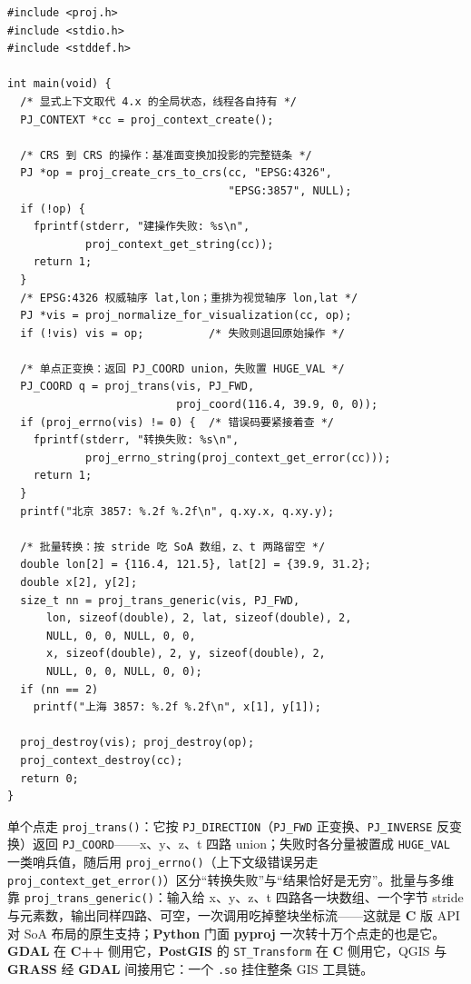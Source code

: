 \documentclass[12pt,a4paper,fontset=fandol]{ctexbook}
\newcommand{\Fn}[1]{\texttt{#1()}}
\newcommand{\Tp}[1]{\texttt{#1}}
\newcommand{\Lib}[1]{\textbf{#1}}
\newcommand{\Lang}[1]{\textsf{\bfseries #1}}
\newcommand{\CL}{\Lang{C}}
\newcommand{\CPP}{\Lang{C++}}
\newcommand{\PY}{\Lang{Python}}
\begin{document}
\begin{lstlisting}[style=cstyle,caption={\Lib{PROJ}：上下文创建、轴序归一化与转换错误处理},label={lst:ch08-proj}]
#include <proj.h>
#include <stdio.h>
#include <stddef.h>

int main(void) {
  /* 显式上下文取代 4.x 的全局状态，线程各自持有 */
  PJ_CONTEXT *cc = proj_context_create();

  /* CRS 到 CRS 的操作：基准面变换加投影的完整链条 */
  PJ *op = proj_create_crs_to_crs(cc, "EPSG:4326",
                                  "EPSG:3857", NULL);
  if (!op) {
    fprintf(stderr, "建操作失败: %s\n",
            proj_context_get_string(cc));
    return 1;
  }
  /* EPSG:4326 权威轴序 lat,lon；重排为视觉轴序 lon,lat */
  PJ *vis = proj_normalize_for_visualization(cc, op);
  if (!vis) vis = op;          /* 失败则退回原始操作 */

  /* 单点正变换：返回 PJ_COORD union，失败置 HUGE_VAL */
  PJ_COORD q = proj_trans(vis, PJ_FWD,
                          proj_coord(116.4, 39.9, 0, 0));
  if (proj_errno(vis) != 0) {  /* 错误码要紧接着查 */
    fprintf(stderr, "转换失败: %s\n",
            proj_errno_string(proj_context_get_error(cc)));
    return 1;
  }
  printf("北京 3857: %.2f %.2f\n", q.xy.x, q.xy.y);

  /* 批量转换：按 stride 吃 SoA 数组，z、t 两路留空 */
  double lon[2] = {116.4, 121.5}, lat[2] = {39.9, 31.2};
  double x[2], y[2];
  size_t nn = proj_trans_generic(vis, PJ_FWD,
      lon, sizeof(double), 2, lat, sizeof(double), 2,
      NULL, 0, 0, NULL, 0, 0,
      x, sizeof(double), 2, y, sizeof(double), 2,
      NULL, 0, 0, NULL, 0, 0);
  if (nn == 2)
    printf("上海 3857: %.2f %.2f\n", x[1], y[1]);

  proj_destroy(vis); proj_destroy(op);
  proj_context_destroy(cc);
  return 0;
}
\end{lstlisting}

单个点走 \Fn{proj\_trans}：它按 \Tp{PJ\_DIRECTION}（\Tp{PJ\_FWD} 正变换、\Tp{PJ\_INVERSE} 反变换）返回 \Tp{PJ\_COORD}——x、y、z、t 四路 union；失败时各分量被置成 \Tp{HUGE\_VAL} 一类哨兵值，随后用 \Fn{proj\_errno}（上下文级错误另走 \Fn{proj\_context\_get\_error}）区分``转换失败''与``结果恰好是无穷''。批量与多维靠 \Fn{proj\_trans\_generic}：输入给 x、y、z、t 四路各一块数组、一个字节 stride 与元素数，输出同样四路、可空，一次调用吃掉整块坐标流——这就是 \CL{} 版 API 对 SoA 布局的原生支持；\PY{} 门面 \Lib{pyproj} 一次转十万个点走的也是它。\Lib{GDAL} 在 \CPP{} 侧用它，\Lib{PostGIS} 的 \Tp{ST\_Transform} 在 \CL{} 侧用它，QGIS 与 \Lib{GRASS} 经 \Lib{GDAL} 间接用它：一个 \Tp{.so} 挂住整条 GIS 工具链。
\end{document}
